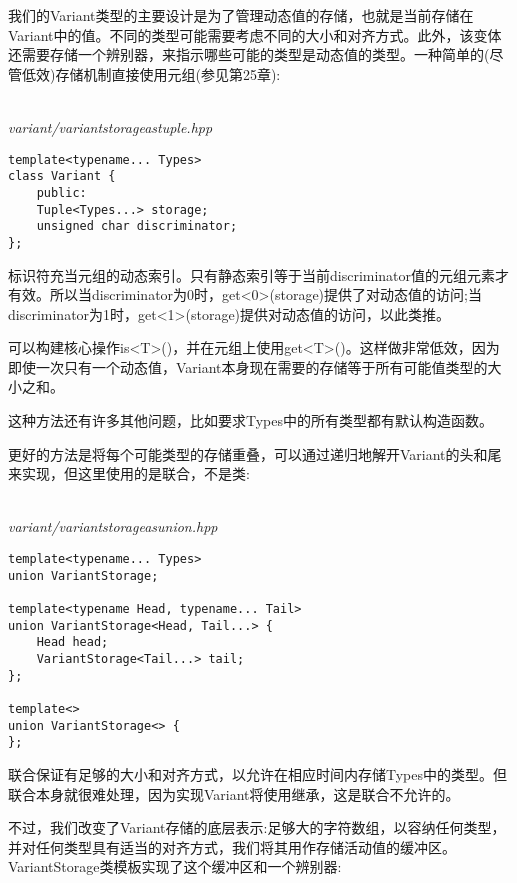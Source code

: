 我们的Variant类型的主要设计是为了管理动态值的存储，也就是当前存储在Variant中的值。不同的类型可能需要考虑不同的大小和对齐方式。此外，该变体还需要存储一个辨别器，来指示哪些可能的类型是动态值的类型。一种简单的(尽管低效)存储机制直接使用元组(参见第25章):

\hspace*{\fill} \\ %
\noindent
\textit{variant/variantstorageastuple.hpp}
\begin{lstlisting}[style=styleCXX]
template<typename... Types>
class Variant {
	public:
	Tuple<Types...> storage;
	unsigned char discriminator;
};
\end{lstlisting}

标识符充当元组的动态索引。只有静态索引等于当前discriminator值的元组元素才有效。所以当discriminator为0时，get<0>(storage)提供了对动态值的访问;当discriminator为1时，get<1>(storage)提供对动态值的访问，以此类推。

可以构建核心操作is<T>()，并在元组上使用get<T>()。这样做非常低效，因为即使一次只有一个动态值，Variant本身现在需要的存储等于所有可能值类型的大小之和。

\begin{tcolorbox}[colback=webgreen!5!white,colframe=webgreen!75!black]
\hspace*{0.75cm}这种方法还有许多其他问题，比如要求Types中的所有类型都有默认构造函数。
\end{tcolorbox}

更好的方法是将每个可能类型的存储重叠，可以通过递归地解开Variant的头和尾来实现，但这里使用的是联合，不是类:

\hspace*{\fill} \\ %
\noindent
\textit{variant/variantstorageasunion.hpp}
\begin{lstlisting}[style=styleCXX]
template<typename... Types>
union VariantStorage;

template<typename Head, typename... Tail>
union VariantStorage<Head, Tail...> {
	Head head;
	VariantStorage<Tail...> tail;
};

template<>
union VariantStorage<> {
};
\end{lstlisting}

联合保证有足够的大小和对齐方式，以允许在相应时间内存储Types中的类型。但联合本身就很难处理，因为实现Variant将使用继承，这是联合不允许的。

不过，我们改变了Variant存储的底层表示:足够大的字符数组，以容纳任何类型，并对任何类型具有适当的对齐方式，我们将其用作存储活动值的缓冲区。VariantStorage类模板实现了这个缓冲区和一个辨别器:

